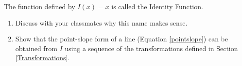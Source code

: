 {\label{identityexercise} The function defined by $I(x) = x$ is called the  Identity Function. 

\begin{enumerate}

\item Discuss with your classmates why this name makes sense.
\item Show that the point-slope form of a line (Equation \ref{pointslope}) can be obtained from $I$ using a sequence of the transformations defined in Section \ref{Transformations}.

\end{enumerate}}
{}